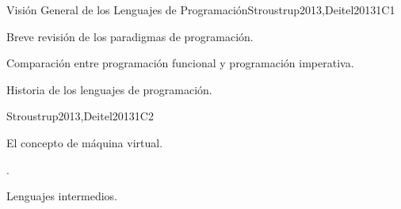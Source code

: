 \begin{syllabus}
\begin{unit}{Visión General de los Lenguajes de Programación}{}{Stroustrup2013,Deitel2013}{1}{C1}
    \begin{topics}
        \item Breve revisión de los paradigmas de programación.
        \item Comparación entre programación funcional y programación imperativa.
        \item Historia de los lenguajes de programación.
    \end{topics}
    \begin{learningoutcomes}
        \item \SPHistoryLODiscussTheForLanguage [\Familiarity]
    \end{learningoutcomes}
\end{unit}

\begin{unit}{\OSVirtualMachines}{}{Stroustrup2013,Deitel2013}{1}{C2}
    \begin{topics}
        \item El concepto de máquina virtual.
        \item \OSVirtualMachinesTopicTypes.
        \item Lenguajes intermedios.
    \end{topics}
    \begin{learningoutcomes}
        \item \OSVirtualMachinesLOExplainTheVirtual [\Familiarity]
        \item \OSVirtualMachinesLODifferentiateEmulation [\Familiarity]
        \item \OSVirtualMachinesLOEvaluateVirtualization [\Assessment]
    \end{learningoutcomes}
\end{unit}


\end{syllabus}
